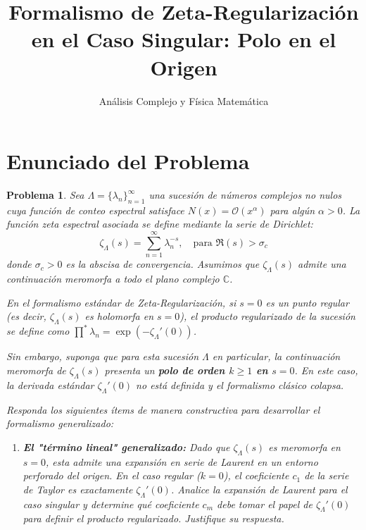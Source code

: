 \documentclass[12pt,a4paper]{article}
\title{\textbf{Formalismo de Zeta-Regularización en el Caso Singular: Polo en el Origen}}
\author{Análisis Complejo y Física Matemática}
\date{}
\newtheorem{problem}{Problema}
\begin{document}
\maketitle

\section*{Enunciado del Problema}

\begin{problem}
Sea $\Lambda = \{\lambda_n\}_{n=1}^\infty$ una sucesión de números complejos no nulos cuya función de conteo espectral satisface $N(x) = \mathcal{O}(x^\alpha)$ para algún $\alpha > 0$. La función zeta espectral asociada se define mediante la serie de Dirichlet:
\begin{equation}
    \zeta_{\Lambda}(s) = \sum_{n=1}^{\infty} \lambda_n^{-s}, \quad \text{para } \Re(s) > \sigma_c
\end{equation}
donde $\sigma_c > 0$ es la abscisa de convergencia. Asumimos que $\zeta_{\Lambda}(s)$ admite una continuación meromorfa a todo el plano complejo $\mathbb{C}$.

En el formalismo estándar de Zeta-Regularización, si $s=0$ es un punto regular (es decir, $\zeta_{\Lambda}(s)$ es holomorfa en $s=0$), el producto regularizado de la sucesión se define como $\prod^* \lambda_n = \exp(-\zeta_{\Lambda}'(0))$. 

Sin embargo, suponga que para esta sucesión $\Lambda$ en particular, la continuación meromorfa de $\zeta_{\Lambda}(s)$ presenta un \textbf{polo de orden $k \ge 1$ en $s=0$}. En este caso, la derivada estándar $\zeta_{\Lambda}'(0)$ no está definida y el formalismo clásico colapsa.

Responda los siguientes ítems de manera constructiva para desarrollar el formalismo generalizado:

\begin{enumerate}[label=\alph*)]
    \item \textbf{El "término lineal" generalizado:} Dado que $\zeta_{\Lambda}(s)$ es meromorfa en $s=0$, esta admite una expansión en serie de Laurent en un entorno perforado del origen. En el caso regular ($k=0$), el coeficiente $c_1$ de la serie de Taylor es exactamente $\zeta_{\Lambda}'(0)$. Analice la expansión de Laurent para el caso singular y determine qué coeficiente $c_m$ debe tomar el papel de $\zeta_{\Lambda}'(0)$ para definir el producto regularizado. Justifique su respuesta.
    

\end{enumerate}
\end{problem}
\end{document}
